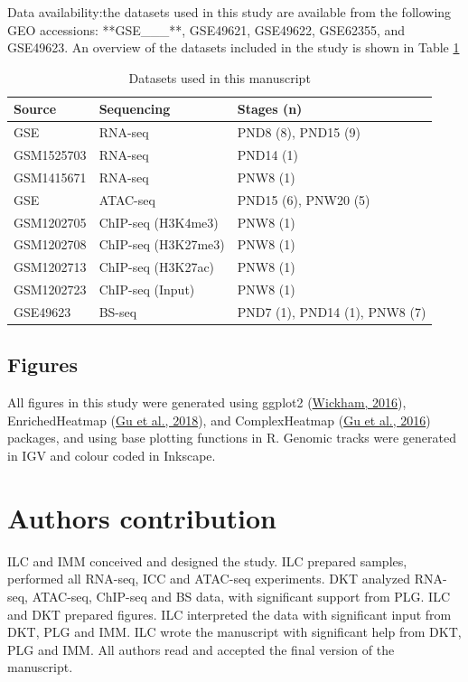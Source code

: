 \documentclass[12pt,twoside]{reedthesis}
\begin{document}
Data availability:the datasets used in this study are available from the
following GEO accessions: **GSE\_\_\_**, GSE49621, GSE49622,
GSE62355, and GSE49623. An overview of the datasets included in the
study is shown in Table \ref{tab:devtab1}
\begin{longtable}[t]{lll}
\caption[Datasets used in this manuscript]{\label{tab:devtab1}Datasets used in this manuscript}\\
\toprule
Source & Sequencing & Stages (n)\\
\midrule
GSE & RNA-seq & PND8 (8), PND15 (9)\\
GSM1525703 & RNA-seq & PND14 (1)\\
GSM1415671 & RNA-seq & PNW8 (1)\\
GSE & ATAC-seq & PND15 (6), PNW20 (5)\\
GSM1202705 & ChIP-seq (H3K4me3) & PNW8 (1)\\
\addlinespace
GSM1202708 & ChIP-seq (H3K27me3) & PNW8 (1)\\
GSM1202713 & ChIP-seq (H3K27ac) & PNW8 (1)\\
GSM1202723 & ChIP-seq (Input) & PNW8 (1)\\
GSE49623 & BS-seq & PND7 (1), PND14 (1), PNW8 (7)\\
\bottomrule
\end{longtable}
\hypertarget{figures}{%
\subsection{Figures}\label{figures}}

All figures in this study were generated using ggplot2 (\protect\hyperlink{ref-wickham2016}{Wickham, 2016}),
EnrichedHeatmap (\protect\hyperlink{ref-gu2018}{Gu et al., 2018}), and ComplexHeatmap (\protect\hyperlink{ref-gu2016}{Gu et al., 2016}) packages, and
using base plotting functions in R. Genomic tracks were generated in IGV
and colour coded in Inkscape.

\hypertarget{authors-contribution}{%
\section{Authors contribution}\label{authors-contribution}}

ILC and IMM conceived and designed the study. ILC prepared samples,
performed all RNA-seq, ICC and ATAC-seq experiments. DKT analyzed
RNA-seq, ATAC-seq, ChIP-seq and BS data, with significant support from
PLG. ILC and DKT prepared figures. ILC interpreted the data with
significant input from DKT, PLG and IMM. ILC wrote the manuscript with
significant help from DKT, PLG and IMM. All authors read and accepted
the final version of the manuscript.
\end{document}
